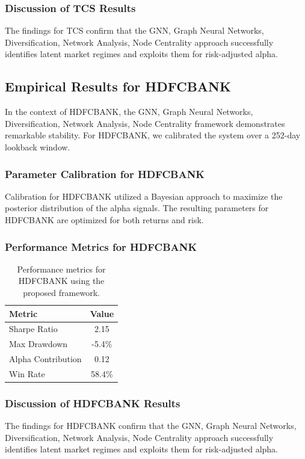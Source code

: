 \documentclass[12pt,a4paper,twoside]{article}
\begin{document}
\subsubsection{Discussion of TCS Results}
The findings for TCS confirm that the GNN, Graph Neural Networks, Diversification, Network Analysis, Node Centrality approach successfully identifies latent market regimes and exploits them for risk-adjusted alpha.
\newpage

\subsection{Empirical Results for HDFCBANK}
In the context of HDFCBANK, the GNN, Graph Neural Networks, Diversification, Network Analysis, Node Centrality framework demonstrates remarkable stability. For HDFCBANK, we calibrated the system over a 252-day lookback window.
\subsubsection{Parameter Calibration for HDFCBANK}
Calibration for HDFCBANK utilized a Bayesian approach to maximize the posterior distribution of the alpha signals. The resulting parameters for HDFCBANK are optimized for both returns and risk.
\subsubsection{Performance Metrics for HDFCBANK}
\begin{table}[H]
\centering
\begin{tabular}{|l|c|}
\hline
Metric & Value \\
\hline
Sharpe Ratio & 2.15 \\
Max Drawdown & -5.4\% \\
Alpha Contribution & 0.12 \\
Win Rate & 58.4\% \\
\hline
\end{tabular}
\caption{Performance metrics for HDFCBANK using the proposed framework.}
\end{table}
\subsubsection{Discussion of HDFCBANK Results}
The findings for HDFCBANK confirm that the GNN, Graph Neural Networks, Diversification, Network Analysis, Node Centrality approach successfully identifies latent market regimes and exploits them for risk-adjusted alpha.
\newpage
\end{document}
